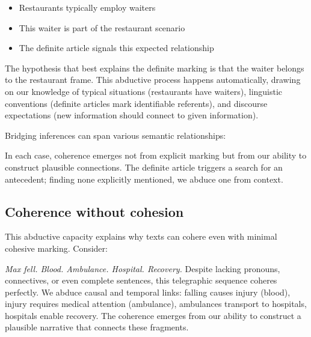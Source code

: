 \begin{itemize}[noitemsep]
   \item Restaurants typically employ waiters
   \item This waiter is part of the restaurant scenario
   \item The definite article signals this expected relationship
\end{itemize}

The hypothesis that best explains the definite marking is that the waiter belongs to the restaurant frame. This abductive process happens automatically, drawing on our knowledge of typical situations (restaurants have waiters), linguistic conventions (definite articles mark identifiable referents), and discourse expectations (new information should connect to given information).

Bridging inferences can span various semantic relationships:

\ea
   \z
\z
In each case, coherence emerges not from explicit marking but from our ability to construct plausible connections. The definite article triggers a search for an antecedent; finding none explicitly mentioned, we abduce one from context.

\subsection{Coherence without cohesion}

This abductive capacity explains why texts can cohere even with minimal cohesive marking. Consider:

\ea
   \textit{Max fell. Blood. Ambulance. Hospital. Recovery.}
\z
Despite lacking pronouns, connectives, or even complete sentences, this telegraphic sequence coheres perfectly. We abduce causal and temporal links: falling causes injury (blood), injury requires medical attention (ambulance), ambulances transport to hospitals, hospitals enable recovery. The coherence emerges from our ability to construct a plausible narrative that connects these fragments.

